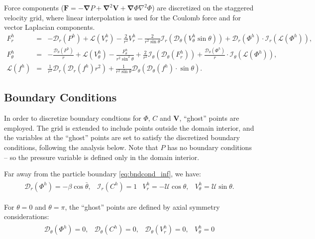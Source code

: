 \documentclass[10pt]{ijnam}
\newcommand{\pars}[1]{\left(#1\right)}
\newcommand\Laplacian{\nabla^2}
\newcommand\bnabla{\boldsymbol{\nabla}}
\newcommand\bLaplacian{\boldsymbol{\nabla}^2}
\newcommand\bV{\boldsymbol{V}}
\newcommand\bF{\boldsymbol{F}}
\newcommand\cI{\mathcal{I}}
\newcommand\cD{\mathcal{D}}
\newcommand\cL{\mathcal{L}}
\newcommand\cU{\mathscr{U}}
\begin{document}
Force components ($\bF = -\bnabla P + \bLaplacian \bV + \bnabla \varPhi \Laplacian \varPhi$) 
are discretized on the staggered velocity grid, where
linear interpolation is used for the Coulomb force and for vector Laplacian components.
\begin{eqnarray}
\nonumber
F^h_r &=& -\cD_r(P^h) 
          + \cL(V^h_r) - \frac{2}{r^2} V^h_r 
		  - \frac{2}{r^2 \sin\theta} \cI_r(\cD_\theta (V^h_\theta \sin\theta))
          + \cD_r(\varPhi^h) \cdot \cI_r(\cL(\varPhi^h)), \\
F^h_\theta &=& -\frac{\cD_\theta(P^h)}{r} 
		  + \cL(V^h_\theta) - \frac{F^h_\theta}{r^2 \sin^2\theta} 
		  + \frac{2}{r^2} \cI_\theta(\cD_\theta(F^h_r))
		  + \frac{\cD_\theta(\varPhi^h)}{r} \cdot \cI_\theta(\cL(\varPhi^h)), \\
\nonumber
\cL(f^h) &=& \frac{1}{r^2}\cD_r\pars{\cD_r(f^h) r^2} + 
\frac{1}{r^2 \sin\theta} \cD_\theta\pars{\cD_\theta(f^h) \cdot \sin\theta}.
\end{eqnarray}


\subsection{Boundary Conditions} \label{sec:disc_boundary}
In order to discretize boundary condtions for $\varPhi$, $C$ and $\bV$, 
``ghost'' points are employed. 
The grid is extended to include points outside the domain interior,
and the variables at the ``ghost'' points are set to satisfy 
the discretized boundary conditions, following the analysis below.
Note that $P$ has no boundary conditions -- so the pressure variable is defined 
only in the domain interior.

Far away from the particle boundary \eqref{eq:bndcond_inf}, we have:
\begin{eqnarray*}
\begin{array}{cccc}
\cD_r \pars{\varPhi^h} = -\beta \cos\bar{\theta}, &
\cI_r \pars{C^h} = 1 &
V_r^h = -\cU \cos\theta, &
V_\theta^h = \cU \sin\theta.
\end{array}\end{eqnarray*}

For $\theta = 0$ and $\theta = \pi$, the ``ghost'' points are defined by axial 
symmetry considerations:
\begin{eqnarray*} 
\begin{array}{cccc}
\cD_\theta \pars{\varPhi^h} = 0, &
\cD_\theta \pars{C^h} = 0, &
\cD_\theta \pars{V_r^h} = 0, &
V_\theta^h = 0
\end{array}
\end{eqnarray*}
\end{document}

